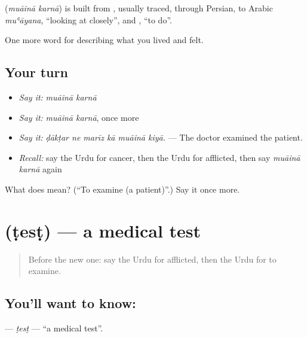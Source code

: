 \begin{cousinweb}
\textbf{ } (\emph{muāinā karnā}) is built from \textbf{}, usually traced, through Persian, to Arabic \emph{muʿāyana}, \textquotedblleft{}looking at closely\textquotedblright{}, and \textbf{}, \textquotedblleft{}to do\textquotedblright{}.
\end{cousinweb}

\begin{grammarlens}[title={What you've built}]
One more word for describing what you lived and felt.
\end{grammarlens}

\subsection*{Your turn}
\begin{itemize}
\raggedright
  \item \emph{Say it:} \emph{muāinā karnā}
  \item \emph{Say it:} \emph{muāinā karnā}, once more
  \item \emph{Say it:} \emph{ḍākṭar ne marīz kā muāinā kiyā.} — The doctor examined the patient.
  \item \emph{Recall:} say the Urdu for cancer, then the Urdu for afflicted, then say \emph{muāinā karnā} again
\end{itemize}

\begin{tcolorbox}[breakable,colback=teal!4,colframe=teal!35!black,title={Before you move on}]
What does   mean? (\textquotedblleft{}To examine (a patient)\textquotedblright{}.) Say it once more.
\end{tcolorbox}
\section[\texorpdfstring{\ur{ٹیسٹ} (ṭesṭ)}{ٹیسٹ (ṭesṭ)}]{ (ṭesṭ) — a medical test}

\label{lesson:UR-C476-test}



\begin{quote}
Before the new one: say the Urdu for afflicted, then the Urdu for to examine.
\end{quote}

\subsection*{You'll want to know: }
\textbf{} — \emph{ṭesṭ} — \textquotedblleft{}a medical test\textquotedblright{}.


